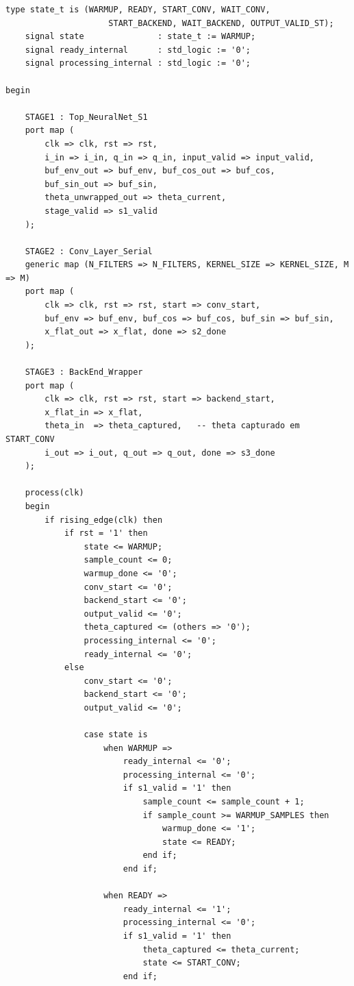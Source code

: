 \documentclass[a4paper,12pt]{article}
\begin{document}
\begin{lstlisting}[style=vhdlstyle,
    caption={C\'odigo VHDL completo do \texttt{NeuralNet\_Complete}.},
    label={lst:top}]
    type state_t is (WARMUP, READY, START_CONV, WAIT_CONV,
                     START_BACKEND, WAIT_BACKEND, OUTPUT_VALID_ST);
    signal state               : state_t := WARMUP;
    signal ready_internal      : std_logic := '0';
    signal processing_internal : std_logic := '0';

begin

    STAGE1 : Top_NeuralNet_S1
    port map (
        clk => clk, rst => rst,
        i_in => i_in, q_in => q_in, input_valid => input_valid,
        buf_env_out => buf_env, buf_cos_out => buf_cos,
        buf_sin_out => buf_sin,
        theta_unwrapped_out => theta_current,
        stage_valid => s1_valid
    );

    STAGE2 : Conv_Layer_Serial
    generic map (N_FILTERS => N_FILTERS, KERNEL_SIZE => KERNEL_SIZE, M => M)
    port map (
        clk => clk, rst => rst, start => conv_start,
        buf_env => buf_env, buf_cos => buf_cos, buf_sin => buf_sin,
        x_flat_out => x_flat, done => s2_done
    );

    STAGE3 : BackEnd_Wrapper
    port map (
        clk => clk, rst => rst, start => backend_start,
        x_flat_in => x_flat,
        theta_in  => theta_captured,   -- theta capturado em START_CONV
        i_out => i_out, q_out => q_out, done => s3_done
    );

    process(clk)
    begin
        if rising_edge(clk) then
            if rst = '1' then
                state <= WARMUP;
                sample_count <= 0;
                warmup_done <= '0';
                conv_start <= '0';
                backend_start <= '0';
                output_valid <= '0';
                theta_captured <= (others => '0');
                processing_internal <= '0';
                ready_internal <= '0';
            else
                conv_start <= '0';
                backend_start <= '0';
                output_valid <= '0';

                case state is
                    when WARMUP =>
                        ready_internal <= '0';
                        processing_internal <= '0';
                        if s1_valid = '1' then
                            sample_count <= sample_count + 1;
                            if sample_count >= WARMUP_SAMPLES then
                                warmup_done <= '1';
                                state <= READY;
                            end if;
                        end if;

                    when READY =>
                        ready_internal <= '1';
                        processing_internal <= '0';
                        if s1_valid = '1' then
                            theta_captured <= theta_current;
                            state <= START_CONV;
                        end if;


\end{lstlisting}
\end{document}
